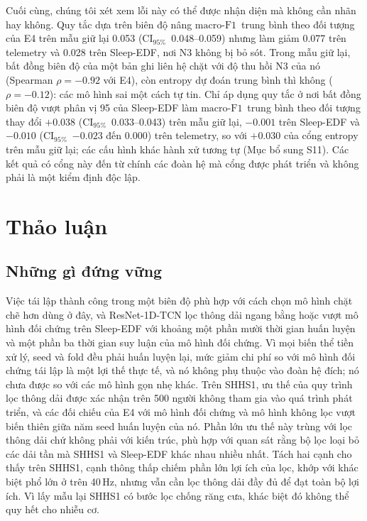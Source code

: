 \documentclass[11pt,a4paper]{article}
\newcommand{\mf}{\ensuremath{\mathrm{macro\text{-}F1}}}
\newcommand{\ci}{\ensuremath{\mathrm{CI}_{95\%}}}
\begin{document}
Cuối cùng, chúng tôi xét xem lỗi này có thể được nhận diện mà không cần nhãn hay không. Quy tắc dựa trên biên
độ nâng \mf\ trung bình theo đối tượng của E4 trên mẫu giữ lại 0.053 (\ci\ 0.048--0.059) nhưng làm giảm 0.077
trên telemetry và 0.028 trên Sleep-EDF, nơi N3 không bị bỏ sót. Trong mẫu giữ lại, bất đồng biên độ của một bản
ghi liên hệ chặt với độ thu hồi N3 của nó (Spearman $\rho=-0.92$ với E4), còn entropy dự đoán trung bình thì không
($\rho=-0.12$): các mô hình sai một cách tự tin. Chỉ áp dụng quy tắc ở nơi bất đồng biên độ vượt phân vị 95 của
Sleep-EDF làm \mf\ trung bình theo đối tượng thay đổi $+0.038$ (\ci\ 0.033--0.043) trên mẫu giữ lại, $-0.001$ trên
Sleep-EDF và $-0.010$ (\ci\ $-0.023$ đến 0.000) trên telemetry, so với $+0.030$ của cổng entropy trên mẫu giữ
lại; các cấu hình khác hành xử tương tự (Mục bổ sung S11). Các kết quả có cổng này đến từ chính các đoàn hệ mà
cổng được phát triển và không phải là một kiểm định độc lập.

\section{Thảo luận}

\subsection{Những gì đứng vững}

Việc tái lập thành công trong một biên độ phù hợp với cách chọn mô hình chặt chẽ hơn dùng ở đây, và
ResNet-1D-TCN lọc thông dải ngang bằng hoặc vượt mô hình đối chứng trên Sleep-EDF với khoảng một phần mười thời
gian huấn luyện và một phần ba thời gian suy luận của mô hình đối chứng. Vì mọi biến thể tiền xử lý, seed và fold
đều phải huấn luyện lại, mức giảm chi phí so với mô hình đối chứng tái lập là một lợi thế thực tế, và nó không
phụ thuộc vào đoàn hệ đích; nó chưa được so với các mô hình gọn nhẹ khác. Trên SHHS1, ưu thế của quy trình lọc
thông dải được xác nhận trên 500 người không tham gia vào quá trình phát triển, và các đối chiếu của E4 với mô
hình đối chứng và mô hình không lọc vượt biến thiên giữa năm seed huấn luyện của nó. Phần lớn ưu thế này trùng
với lọc thông dải chứ không phải với kiến trúc, phù hợp với quan sát rằng bộ lọc loại bỏ các dải tần mà SHHS1 và
Sleep-EDF khác nhau nhiều nhất. Tách hai cạnh cho thấy trên SHHS1, cạnh thông thấp chiếm phần lớn lợi ích của lọc,
khớp với khác biệt phổ lớn ở trên 40\,Hz, nhưng vẫn cần lọc thông dải đầy đủ để đạt toàn bộ lợi ích. Vì lấy mẫu
lại SHHS1 có bước lọc chống răng cưa, khác biệt đó không thể quy hết cho nhiễu cơ.
\end{document}

